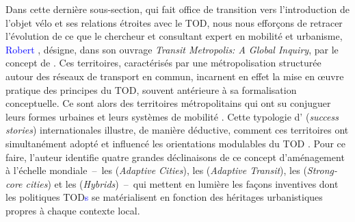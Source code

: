 \begin{refsegment}
Dans cette dernière sous-section, qui fait office de transition vers l’introduction de l’objet vélo et ses relations étroites avec le \acrshort{TOD}, nous nous efforçons de retracer l’évolution de ce que le chercheur et consultant expert en mobilité et urbanisme, \textcolor{blue}{Robert} \textcolor{blue}{\textcite[11]{cervero_transit_1998}}, désigne, dans son ouvrage \foreignlanguage{english}{\textsl{Transit Metropolis: A Global Inquiry}}, par le concept de . Ces territoires, caractérisés par une métropolisation structurée autour des réseaux de transport en commun, incarnent en effet la mise en œuvre pratique des principes du \acrshort{TOD}, souvent antérieure à sa formalisation conceptuelle. Ce sont alors des territoires métropolitains qui ont su conjuguer leurs formes urbaines et leurs systèmes de mobilité \textcolor{blue}{\autocite[132]{cervero_transit_2020}}. Cette typologie d' (\textsl{success stories}) internationales illustre, de manière déductive, comment ces territoires ont simultanément adopté et influencé les orientations modulables du \acrshort{TOD} \textcolor{blue}{\autocite[134]{wheeler_transit_2000}}. Pour ce faire, l’auteur identifie quatre grandes déclinaisons de ce concept d’aménagement à l’échelle mondiale~–~les  (\textsl{Adaptive Cities}), les  (\textsl{Adaptive Transit}), les  (\textsl{Strong-core cities}) et les  (\textsl{Hybrids})~–~qui mettent en lumière les façons inventives dont les politiques \acrshort{TOD}\textcolor{blue}{s} se matérialisent en fonction des héritages urbanistiques propres à chaque contexte local.%


\end{refsegment}
